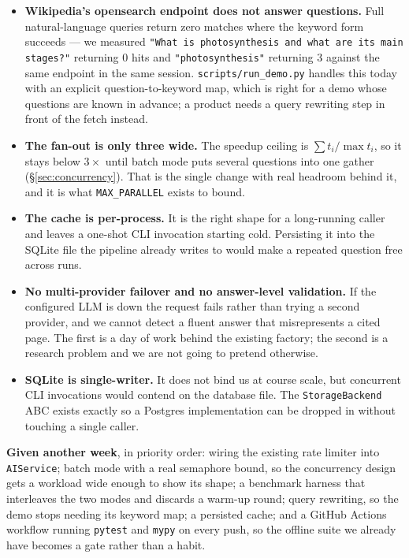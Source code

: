\documentclass[11pt,a4paper]{article}
\begin{document}
\begin{itemize}[leftmargin=1.2em,itemsep=4pt]
  \item \textbf{Wikipedia's opensearch endpoint does not answer questions.} Full
  natural-language queries return zero matches where the keyword form succeeds --- we measured
  \texttt{"What is photosynthesis and what are its main stages?"} returning 0 hits and
  \texttt{"photosynthesis"} returning 3 against the same endpoint in the same session.
  \texttt{scripts/run\_demo.py} handles this today with an explicit question-to-keyword map,
  which is right for a demo whose questions are known in advance; a product needs a query
  rewriting step in front of the fetch instead.

  \item \textbf{The fan-out is only three wide.} The speedup ceiling is
  $\sum t_i / \max t_i$, so it stays below $3\times$ until batch mode puts several questions into
  one gather (\S\ref{sec:concurrency}). That is the single change with real headroom behind it,
  and it is what \texttt{MAX\_PARALLEL} exists to bound.

  \item \textbf{The cache is per-process.} It is the right shape for a long-running caller and
  leaves a one-shot CLI invocation starting cold. Persisting it into the SQLite file the pipeline
  already writes to would make a repeated question free across runs.

  \item \textbf{No multi-provider failover and no answer-level validation.} If the configured
  LLM is down the request fails rather than trying a second provider, and we cannot detect a
  fluent answer that misrepresents a cited page. The first is a day of work behind the existing
  factory; the second is a research problem and we are not going to pretend otherwise.

  \item \textbf{SQLite is single-writer.} It does not bind us at course scale, but concurrent CLI
  invocations would contend on the database file. The \texttt{StorageBackend} ABC exists exactly
  so a Postgres implementation can be dropped in without touching a single caller.
\end{itemize}

\textbf{Given another week}, in priority order: wiring the existing rate limiter into
\texttt{AIService}; batch mode with a real semaphore bound, so the
concurrency design gets a workload wide enough to show its shape; a benchmark harness that
interleaves the two modes and discards a warm-up round; query rewriting, so the demo stops
needing its keyword map; a persisted cache; and a GitHub Actions workflow running
\texttt{pytest} and \texttt{mypy} on every push, so the offline suite we already have becomes a
gate rather than a habit.
\end{document}
